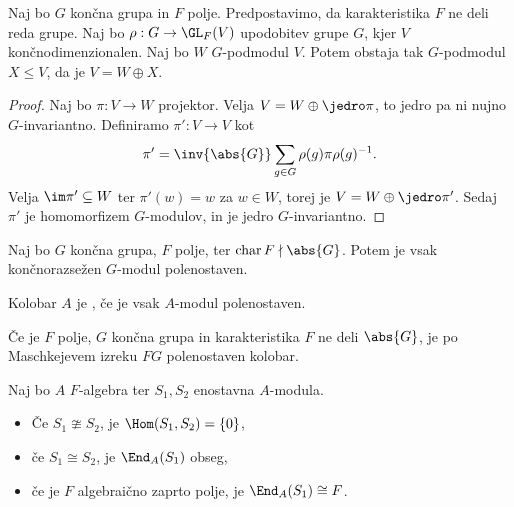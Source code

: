 
\begin{izrek}[Maschke]
  Naj bo $G$ končna grupa in $F$ polje.
  Predpostavimo, da karakteristika $F$ ne deli reda grupe.
  Naj bo $\rho: G \to \GL_F(V)$ upodobitev grupe $G$, kjer $V$
  končnodimenzionalen.
  Naj bo $W$ $G$-podmodul $V$.
  Potem obstaja tak $G$-podmodul $X \le V$, da je $V = W \oplus X$.
\end{izrek}

\begin{proof}
  Naj bo $\pi: V \to W$ projektor.
  Velja $V = W \oplus \jedro \pi$, to jedro pa ni nujno $G$-invariantno.
  Definiramo $\pi': V \to V$ kot
  \[
	\pi' = \inv{\abs{G}} \sum_{g \in G} \rho(g) \pi \rho(g)^{-1}.
  \]
  Velja $\im \pi' \subseteq W$ ter $\pi'(w) = w$ za $w \in W$, torej je $V = W
  \oplus \jedro \pi'$.
  Sedaj $\pi'$ je homomorfizem $G$-modulov, in je jedro $G$-invariantno.
\end{proof}

\begin{posledica}
  Naj bo $G$ končna grupa, $F$ polje, ter $\operatorname{char} F \nmid \abs{G}$.
  Potem je vsak končnorazsežen $G$-modul polenostaven.
\end{posledica}


\begin{definicija}
  Kolobar $A$ je , če je vsak $A$-modul polenostaven.
\end{definicija}

\begin{primer}
  Če je $F$ polje, $G$ končna grupa in karakteristika $F$ ne deli $\abs{G}$, je
  po Maschkejevem izreku $FG$ polenostaven kolobar.
\end{primer}

\begin{lema}[Schur]
  Naj bo $A$ $F$-algebra ter $S_1, S_2$ enostavna $A$-modula.
  \begin{itemize}
  \item Če $S_1 \ncong S_2$, je $\Hom(S_1, S_2) = \{0\}$,
  \item če $S_1 \cong S_2$, je $\End_A(S_1)$ obseg,
  \item če je $F$ algebraično zaprto polje, je $\End_A(S_1) \cong F$.
  \end{itemize}
\end{lema}

